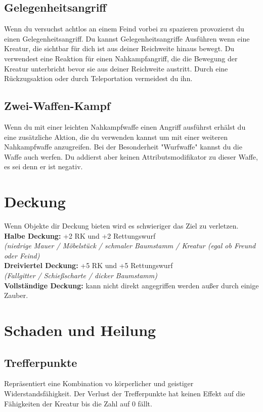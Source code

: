 \subsection{Gelegenheitsangriff}
Wenn du versuchst achtlos an einem Feind vorbei zu spazieren provozierst du einen Gelegenheitsangriff. Du kannst Gelegenheitsangriffe Ausführen wenn eine Kreatur, die sichtbar für dich ist aus deiner Reichweite hinaus bewegt. Du verwendest eine Reaktion für einen Nahkampfangriff, die die Bewegung der Kreatur unterbricht bevor sie aus deiner Reichweite austritt. Durch eine Rückzugsaktion oder durch Teleportation vermeidest du ihn.

\subsection{Zwei-Waffen-Kampf}
Wenn du mit einer leichten Nahkampfwaffe einen Angriff ausführst erhälst du eine zusätzliche Aktion, die du verwenden kannst um mit einer weiteren Nahkampfwaffe anzugreifen. Bei der Besonderheit "Wurfwaffe" kannst du die Waffe auch werfen. Du addierst aber keinen Attributsmodifikator zu dieser Waffe, es sei denn er ist negativ.

\section{Deckung}
\noindent Wenn Objekte dir Deckung bieten wird es schwieriger das Ziel zu verletzen. \\
\noindent \textbf{Halbe Deckung:} +2 RK und +2 Rettungswurf\\
\noindent \textit{(niedrige Mauer / Möbelstück / schmaler Baumstamm / Kreatur (egal ob Freund oder Feind)}\\
\noindent \textbf{Dreiviertel Deckung:} +5 RK und +5 Rettungswurf \\
\noindent \textit{(Fallgitter / Schießscharte / dicker Baumstamm)}\\
\noindent \textbf{Vollständige Deckung:} kann nicht direkt angegriffen werden außer durch einige Zauber.\\

\section{Schaden und Heilung}
\subsection{Trefferpunkte}
Repräsentiert eine Kombination vo körperlicher und geistiger Widerstandsfähigkeit. Der Verlust der Trefferpunkte hat keinen Effekt auf die Fähigkeiten der Kreatur bis die Zahl auf 0 fällt.

